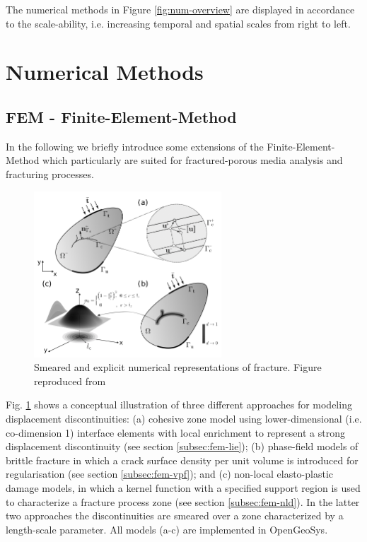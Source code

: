 The numerical methods in Figure \ref{fig:num-overview} are displayed in accordance to the scale-ability, i.e. increasing temporal and spatial scales from right to left.


\section{Numerical Methods}




\subsection*{FEM - Finite-Element-Method}
In the following we briefly introduce some extensions of the Finite-Element-Method which particularly are suited for fractured-porous media analysis and fracturing processes.

\label{subsec:fem-lie}


\label{subsec:fem-vpf}

\label{subsec:fem-nld}
\clearpage
\begin{figure}
\centering
\includegraphics[width=7cm]{figures/Schematic_figure_LIE_PF_NLD}
\caption{Smeared and explicit numerical representations of fracture. Figure reproduced from~\cite{Yoshioka2019}}
\label{fig:ogsfem-overview}
\end{figure}
Fig. \ref{fig:ogsfem-overview} shows a conceptual illustration of three different approaches for modeling displacement discontinuities: (a) cohesive zone model using lower-dimensional (i.e. co-dimension 1) interface elements with local enrichment to represent a strong displacement discontinuity (see section \ref{subsec:fem-lie}); (b) phase-field models of brittle fracture in which a crack surface density per unit volume is introduced for regularisation (see section \ref{subsec:fem-vpf}); and (c) non-local elasto-plastic damage models, in which a kernel function with a specified support region is used to characterize a fracture process zone (see section \ref{subsec:fem-nld}). In the latter two approaches the discontinuities are smeared over a zone characterized by a length-scale parameter. All models (a-c) are implemented in OpenGeoSys.